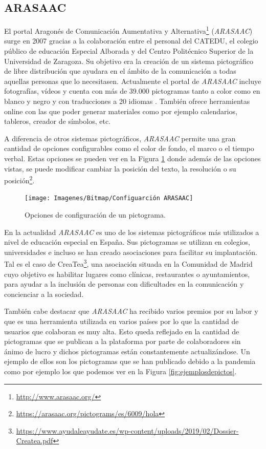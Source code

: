 \subsection{ARASAAC}
\label{cap3:sec:arasaac}
El portal Aragonés de Comunicación Aumentativa y Alternativa\footnote{\url{http://www.arasaac.org/}} (\textit{ARASAAC})
 surge en 2007 gracias a la colaboración entre el personal del CATEDU, el colegio público de educación Especial Alborada y del Centro Politécnico Superior de la Universidad de Zaragoza. Su objetivo era la creación de un sistema pictográfico de libre distribución que ayudara en el ámbito de la comunicación a todas aquellas personas que lo necesitasen.
Actualmente el portal de \textit{ARASAAC} incluye fotografías, vídeos y cuenta con más de 39.000 pictogramas tanto a color como en blanco y negro y con traducciones a 20 idiomas \citep{arasaac}. También ofrece herramientas online con las que poder generar materiales como por ejemplo calendarios, tableros, creador de símbolos, etc.

A diferencia de otros sistemas pictográficos, \textit{ARASAAC} permite una gran cantidad de opciones configurables como el color de fondo, el marco o el tiempo verbal. Estas opciones se pueden ver en la Figura \ref{fig:configuarcion-arasaac} donde además de las opciones vistas, se puede modificar cambiar la posición del texto, la resolución o su posición\footnote{\url{https://arasaac.org/pictograms/es/6009/hola}}.



\begin{figure}[h!]
	\centering
	\texttt{[image: Imagenes/Bitmap/Configuarción ARASAAC]}
	\caption{Opciones de configuración de un pictograma.}
	\label{fig:configuarcion-arasaac}
\end{figure}



En la actualidad \textit{ARASAAC} es uno de los sistemas pictográficos más utilizados a nivel de educación especial en España. Sus pictogramas se utilizan en colegios, universidades e incluso se han creado asociaciones para facilitar su implantación. Tal es el caso de CreaTea\footnote{\url{https://www.ayudaleayudate.es/wp-content/uploads/2019/02/Dossier-Createa.pdf}}, una asociación situada en la Comunidad de Madrid cuyo objetivo es habilitar lugares como clínicas, restaurantes o ayuntamientos, para ayudar a la inclusión de personas con dificultades en la comunicación y concienciar a la sociedad.

También cabe destacar que \textit{ARASAAC} ha recibido varios premios por su labor y que es una herramienta utilizada en varios países por lo que la cantidad de usuarios que colaboran es muy alta. Esto queda reflejado en la cantidad de pictogramas que se publican a la plataforma por parte de colaboradores sin ánimo de lucro y dichos pictogramas están constantemente actualizándose. Un ejemplo de ellos son los pictogramas que se han publicado debido a la pandemia como por ejemplo los que podemos ver en la Figura \ref{fig:ejemplosdepictos}.


